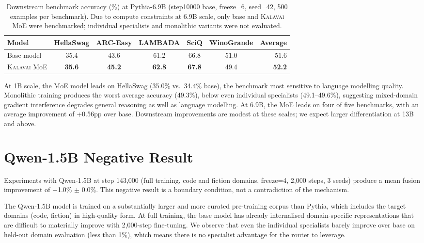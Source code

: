 \documentclass{article}
\newcommand{\kalavai}{\textsc{Kalavai}\xspace}
\begin{document}
\begin{table}[h]
\centering
\caption{Downstream benchmark accuracy (\%) at Pythia-6.9B (step10000 base, freeze=6, seed=42, 500 examples per benchmark). Due to compute constraints at 6.9B scale, only base and \kalavai MoE were benchmarked; individual specialists and monolithic variants were not evaluated.}
\label{tab:bench6b}
\small
\begin{tabular}{lcccccr}
\toprule
\textbf{Model} & \textbf{HellaSwag} & \textbf{ARC-Easy} & \textbf{LAMBADA} & \textbf{SciQ} & \textbf{WinoGrande} & \textbf{Average} \\
\midrule
Base model   & 35.4 & 43.6 & 61.2 & 66.8 & 51.0 & 51.6 \\
\kalavai MoE & \textbf{35.6} & \textbf{45.2} & \textbf{62.8} & \textbf{67.8} & 49.4 & \textbf{52.2} \\
\bottomrule
\end{tabular}
\end{table}

At 1B scale, the MoE model leads on HellaSwag (35.0\% vs.\ 34.4\% base), the benchmark most sensitive to language modelling quality. Monolithic training produces the worst average accuracy (49.3\%), below even individual specialists (49.1--49.6\%), suggesting mixed-domain gradient interference degrades general reasoning as well as language modelling. At 6.9B, the MoE leads on four of five benchmarks, with an average improvement of +0.56pp over base. Downstream improvements are modest at these scales; we expect larger differentiation at 13B and above.

\section{Qwen-1.5B Negative Result}
\label{app:qwen}

Experiments with Qwen-1.5B at step 143,000 (full training, code and fiction domains, freeze=4, 2,000 steps, 3 seeds) produce a mean fusion improvement of $-$1.0\% $\pm$ 0.0\%. This negative result is a boundary condition, not a contradiction of the mechanism.

The Qwen-1.5B model is trained on a substantially larger and more curated pre-training corpus than Pythia, which includes the target domains (code, fiction) in high-quality form. At full training, the base model has already internalised domain-specific representations that are difficult to materially improve with 2,000-step fine-tuning. We observe that even the individual specialists barely improve over base on held-out domain evaluation (less than 1\%), which means there is no specialist advantage for the router to leverage.
\end{document}
